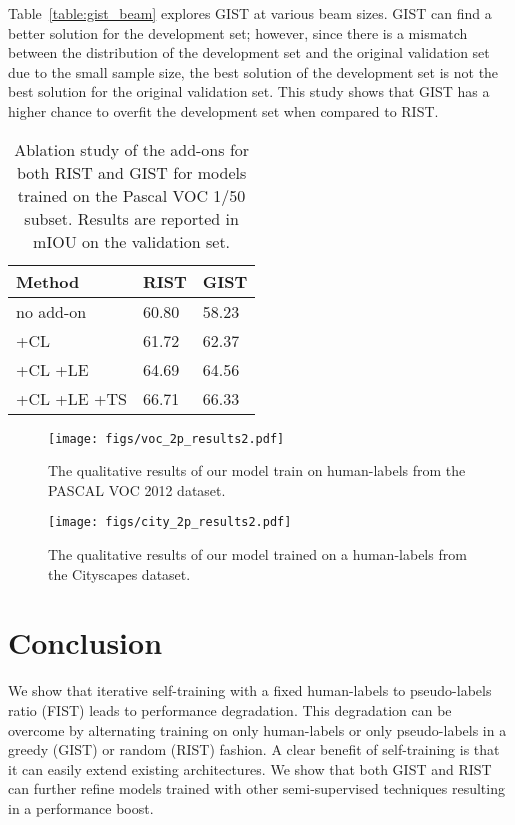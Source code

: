 \documentclass[10pt, conference, compsocconf]{IEEEtran}
\begin{document}
Table~\ref{table:gist_beam} explores GIST at various beam sizes. GIST can find a better solution for the development set; however, since there is a mismatch between the distribution of the development set and the original validation set due to the small sample size, the best solution of the development set is not the best solution for the original validation set. This study shows that GIST has a higher chance to overfit the development set when compared to RIST. 


\begin{table}[!htb]
\centering
\setlength{\tabcolsep}{15pt}
\begin{tabular}{|l||l|l|}
\hline
Method & RIST & GIST \\
\hline
no add-on & 60.80 & 58.23  \\
+CL  & 61.72 & 62.37 \\
+CL +LE & 64.69 & 64.56\\
+CL +LE +TS & 66.71 & 66.33 \\
\hline
\end{tabular}
\bigskip
\caption{Ablation study of the add-ons for both RIST and GIST for models trained on the Pascal VOC 1/50 subset. Results are reported in mIOU on the validation set.}
\label{table:addons}
\end{table}

\begin{figure*}[!htb]
  \centering
  \texttt{[image: figs/voc\_2p\_results2.pdf]}
  \caption{The qualitative results of our model train on  human-labels from the PASCAL VOC 2012 dataset.}
  \label{fig:voc_vis}
\end{figure*}

\begin{figure*}[!htb]
  \centering
  \texttt{[image: figs/city\_2p\_results2.pdf]}
  \caption{The qualitative results of our model trained on a  human-labels from the Cityscapes dataset.}
  \label{fig:city_vis}
\end{figure*}

\section{Conclusion}

We show that iterative self-training with a fixed human-labels to pseudo-labels ratio (FIST) leads to performance degradation. This degradation can be overcome by alternating training on only human-labels or only pseudo-labels in a greedy (GIST) or random (RIST) fashion. A clear benefit of self-training is that it can easily extend existing architectures. 
We show that both GIST and RIST can further refine models trained with other semi-supervised techniques resulting in a performance boost. 




\end{document}
